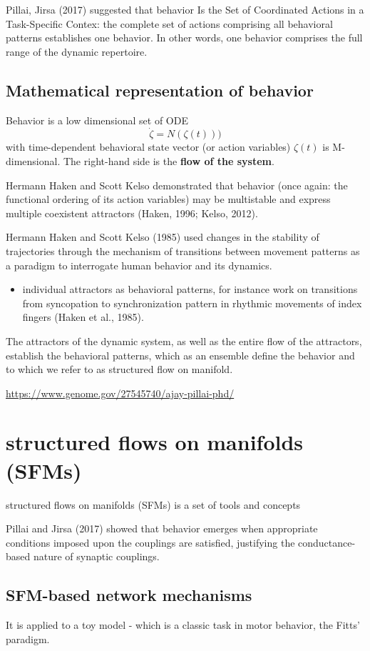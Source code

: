 Pillai, Jirsa (2017) suggested that behavior Is the Set of Coordinated Actions
in a Task-Specific Contex: the complete set of actions comprising all behavioral
patterns establishes one behavior.
In other words, one behavior comprises the full range of the dynamic repertoire.

\subsection{Mathematical representation of behavior}

Behavior is a low dimensional set of ODE 
\begin{equation}
\dot{\zeta} = N(\zeta(t)))
\end{equation}
with time-dependent behavioral state vector (or action variables) $\zeta(t)$ is
M-dimensional. The right-hand side is the {\bf flow of the system}.

Hermann Haken and Scott Kelso demonstrated that behavior (once again: the
functional ordering of its action variables) may be multistable and express
multiple coexistent attractors (Haken, 1996; Kelso, 2012).

Hermann Haken and Scott Kelso (1985) used changes in the stability of
trajectories through the mechanism of transitions between movement patterns as a
paradigm to interrogate human behavior and its dynamics.
\begin{itemize}
  
  \item  individual attractors as behavioral patterns, for instance work on
  transitions from syncopation to synchronization pattern in rhythmic movements
  of index fingers (Haken et al., 1985).

\end{itemize}

The attractors of the dynamic system, as well as the entire flow of the
attractors, establish the behavioral patterns, which as an ensemble define the
behavior and to which we refer to as structured flow on manifold.

\url{https://www.genome.gov/27545740/ajay-pillai-phd/}


\section{structured flows on manifolds (SFMs)}


structured flows on manifolds (SFMs) is a set of tools
and concepts 

Pillai and Jirsa (2017) showed that behavior emerges when appropriate conditions
imposed upon the couplings are satisfied, justifying the conductance-based
nature of synaptic couplings.

\subsection{SFM-based network mechanisms}


It is applied to a toy model - which is a classic task in motor behavior,
the Fitts' paradigm.

